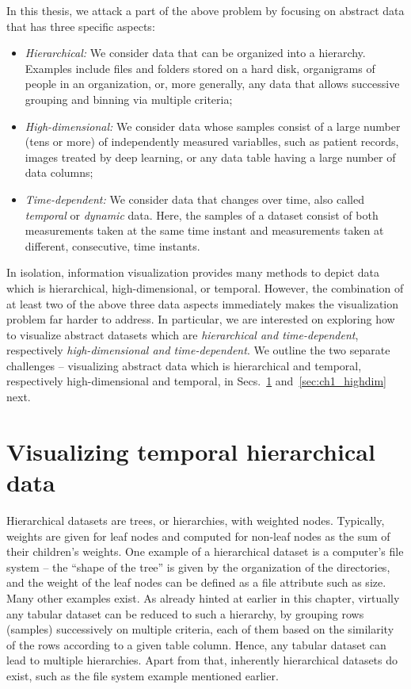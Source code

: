 In this thesis, we attack a part of the above problem by focusing on abstract data that has three specific aspects:

\begin{itemize}
\item\emph{Hierarchical:} We consider data that can be organized into a hierarchy. Examples include files and folders stored on a hard disk, organigrams of people in an organization, or, more generally, any data that allows successive grouping and binning via multiple criteria;
\item\emph{High-dimensional:} We consider data whose samples consist of a large number (tens or more) of independently measured variablles, such as patient records, images treated by deep learning, or any data table having a large number of data columns;
\item\emph{Time-dependent:} We consider data that changes over time, also called \emph{temporal} or \emph{dynamic} data. Here, the samples of a dataset consist of both measurements taken at the same time instant and measurements taken at different, consecutive, time instants. 
\end{itemize}

In isolation, information visualization provides many methods to depict data which is hierarchical, high-dimensional, or temporal. However, the combination of at least two of the above three data aspects immediately makes the visualization problem far harder to address. In particular, we are interested on exploring how to visualize abstract datasets which are \emph{hierarchical and time-dependent}, respectively \emph{high-dimensional and time-dependent}. We outline the two separate challenges -- visualizing abstract data which is hierarchical and temporal, respectively high-dimensional and temporal, in Secs.~\ref{sec:ch1_tempo} and~\ref{sec:ch1_highdim} next.



\section{Visualizing temporal hierarchical data}
\label{sec:ch1_tempo}
%
Hierarchical datasets are trees, or hierarchies, with weighted nodes. Typically, weights are given for leaf nodes and computed for non-leaf nodes as the sum of their children's weights. One example of a hierarchical dataset is a computer's file system -- the ``shape of the tree'' is given by the organization of the directories, and the weight of the leaf nodes can be defined as a file attribute such as size. Many other examples exist. As already hinted at earlier in this chapter, virtually any tabular dataset can be reduced to such a hierarchy, by grouping rows (samples) successively on multiple criteria, each of them based on the similarity of the rows according to a given table column. Hence, any tabular dataset can lead to multiple hierarchies. Apart from that, inherently hierarchical datasets do exist, such as the file system example mentioned earlier.

